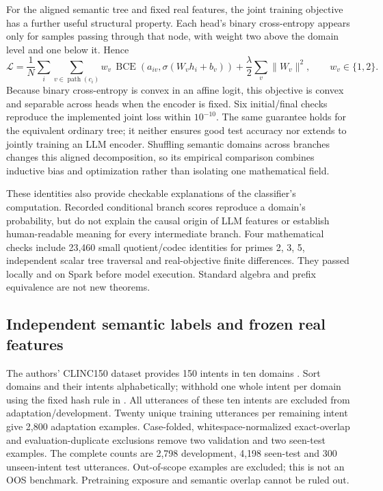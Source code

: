 \documentclass[11pt]{article}
\begin{document}
For the aligned semantic tree and fixed real features, the joint training
objective has a further useful structural property. Each head's binary
cross-entropy appears only for samples passing through that node, with
weight two above the domain level and one below it. Hence
\[
 \mathcal L=\frac1N\sum_i\sum_{v\in\operatorname{path}(c_i)}
 w_v\,\operatorname{BCE}(a_{iv},\sigma(W_vh_i+b_v))
 +\frac{\lambda}{2}\sum_v\|W_v\|^2,\qquad w_v\in\{1,2\}.
\]
Because binary cross-entropy is convex in an affine logit, this objective
is convex and separable across heads when the encoder is fixed. Six
initial/final checks reproduce the implemented joint loss within
\(10^{-10}\). The same guarantee holds for the equivalent ordinary tree;
it neither ensures good test accuracy nor extends to jointly training
an LLM encoder. Shuffling semantic domains across branches changes this
aligned decomposition, so its empirical comparison combines inductive bias
and optimization rather than isolating one mathematical field.

These identities also provide checkable explanations of the classifier's
computation. Recorded conditional branch scores reproduce a domain's
probability, but do not explain the causal origin of LLM features or establish
human-readable meaning for every intermediate branch. Four mathematical
checks include 23,460 small quotient/codec identities for primes 2, 3, 5,
independent scalar tree traversal and real-objective finite differences.
They passed locally and on Spark before model execution. Standard algebra
and prefix equivalence are not new theorems.

\subsection{Independent semantic labels and frozen real features}

The authors' CLINC150 dataset provides 150 intents in ten domains
\citep{larson2019clinc}. Sort domains and their intents alphabetically;
withhold one whole intent per domain using the fixed hash rule in
. All utterances of these ten
intents are excluded from adaptation/development. Twenty unique training
utterances per remaining intent give 2,800 adaptation examples.
Case-folded, whitespace-normalized exact-overlap and evaluation-duplicate
exclusions remove two validation and two seen-test examples. The complete
counts are 2,798 development, 4,198 seen-test and 300 unseen-intent test
utterances. Out-of-scope examples are excluded; this is not an OOS benchmark.
Pretraining exposure and semantic overlap cannot be ruled out.
\end{document}
